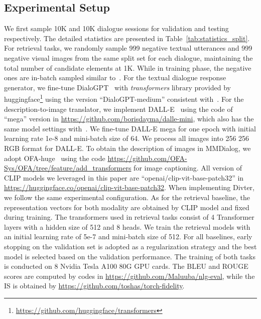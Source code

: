 \documentclass[11pt]{article}
\newcommand{\DataName}{MMDialog}
\begin{document}
\subsection{Experimental Setup}
We first sample 10K and 10K dialogue sessions for validation and testing respectively. The detailed statistics are presented in Table~\ref{tab:statistics_split}. For retrieval tasks, we randomly sample 999 negative textual utterances and 999 negative visual images from the same split set for each dialogue, maintaining the total number of candidate elements at 1K. While in training phase, the negative ones are in-batch sampled similar to~\citet{radford2021learning}. For the textual dialogue response generator, we fine-tune DialoGPT~\cite{zhang2020dialogpt} with \textit{transformers} library provided by huggingface\footnote{\url{https://github.com/huggingface/transformers}} using the version ``DialoGPT-medium'' consistent with~\citet{sun-etal-2022-multimodal}. For the description-to-image translator, we implement DALL-E~\cite{ramesh2021zero} using the code of ``mega'' version in \url{https://github.com/borisdayma/dalle-mini}, which also has the same model settings with~\citet{sun-etal-2022-multimodal}. We fine-tune DALL-E mega for one epoch with initial learning rate 1e-8 and mini-batch size of 64. We process all images into 256  256 RGB format for DALL-E. To obtain the description of images in \DataName, we adopt OFA-huge~\cite{wang2022ofa} using the code \url{https://github.com/OFA-Sys/OFA/tree/feature/add_transformers} for image captioning. All version of CLIP models we leveraged in this paper are ``openai/clip-vit-base-patch32'' in \url{https://huggingface.co/openai/clip-vit-base-patch32}. When implementing Divter, we follow the same experimental configuration. As for the retrieval baseline, the representation vectors for both modality are obtained by CLIP model and fixed during training. The transformers used in retrieval tasks consist of 4 Transformer layers with a hidden size of 512 and 8 heads. We train the retrieval models with an initial learning rate of 5e-7 and mini-batch size of 512. For all baselines, early stopping on the validation set is adopted as a regularization strategy and the best model is selected based on the validation performance. The training of both tasks is conducted on 8 Nvidia Tesla A100 80G GPU cards. The BLEU and ROUGE scores are computed by codes in \url{https://github.com/Maluuba/nlg-eval}, while the IS is obtained by \url{https://github.com/toshas/torch-fidelity}.
\end{document}
